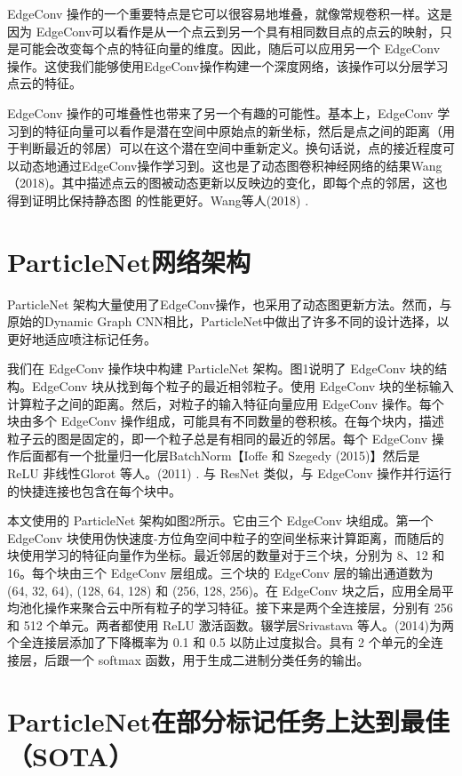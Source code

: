 EdgeConv 操作的一个重要特点是它可以很容易地堆叠，就像常规卷积一样。这是因为 EdgeConv可以看作是从一个点云到另一个具有相同数目点的点云的映射，只是可能会改变每个点的特征向量的维度。因此，随后可以应用另一个 EdgeConv 操作。这使我们能够使用EdgeConv操作构建一个深度网络，该操作可以分层学习点云的特征。

EdgeConv 操作的可堆叠性也带来了另一个有趣的可能性。基本上，EdgeConv 学习到的特征向量可以看作是潜在空间中原始点的新坐标，然后是点之间的距离（用于判断最近的邻居）可以在这个潜在空间中重新定义。换句话说，点的接近程度可以动态地通过EdgeConv操作学习到。这也是了动态图卷积神经网络的结果Wang（2018)。其中描述点云的图被动态更新以反映边的变化，即每个点的邻居，这也得到证明比保持静态图 的性能更好。Wang等人(2018) .

\section{ParticleNet网络架构}
ParticleNet 架构大量使用了EdgeConv操作，也采用了动态图更新方法。然而，与原始的Dynamic Graph CNN相比，ParticleNet中做出了许多不同的设计选择，以更好地适应喷注标记任务。

我们在 EdgeConv 操作块中构建 ParticleNet 架构。图1说明了 EdgeConv 块的结构。EdgeConv 块从找到每个粒子的最近相邻粒子。使用 EdgeConv 块的坐标输入计算粒子之间的距离。然后，对粒子的输入特征向量应用 EdgeConv 操作。每个块由多个 EdgeConv 操作组成，可能具有不同数量的卷积核。在每个块内，描述粒子云的图是固定的，即一个粒子总是有相同的最近的邻居。每个 EdgeConv 操作后面都有一个批量归一化层BatchNorm【Ioffe 和 Szegedy (2015)】然后是 ReLU 非线性Glorot 等人。(2011) . 与 ResNet 类似，与 EdgeConv 操作并行运行的快捷连接也包含在每个块中。

本文使用的 ParticleNet 架构如图2所示。它由三个 EdgeConv 块组成。第一个 EdgeConv 块使用伪快速度-方位角空间中粒子的空间坐标来计算距离，而随后的块使用学习的特征向量作为坐标。最近邻居的数量对于三个块，分别为 8、12 和 16。每个块由三个 EdgeConv 层组成。三个块的 EdgeConv 层的输出通道数为 (64, 32, 64), (128, 64, 128) 和 (256, 128, 256)。在 EdgeConv 块之后，应用全局平均池化操作来聚合云中所有粒子的学习特征。接下来是两个全连接层，分别有 256 和 512 个单元。两者都使用 ReLU 激活函数。辍学层Srivastava 等人。(2014)为两个全连接层添加了下降概率为 0.1 和 0.5 以防止过度拟合。具有 2 个单元的全连接层，后跟一个 softmax 函数，用于生成二进制分类任务的输出。

\section{ParticleNet在部分标记任务上达到最佳（SOTA）}
